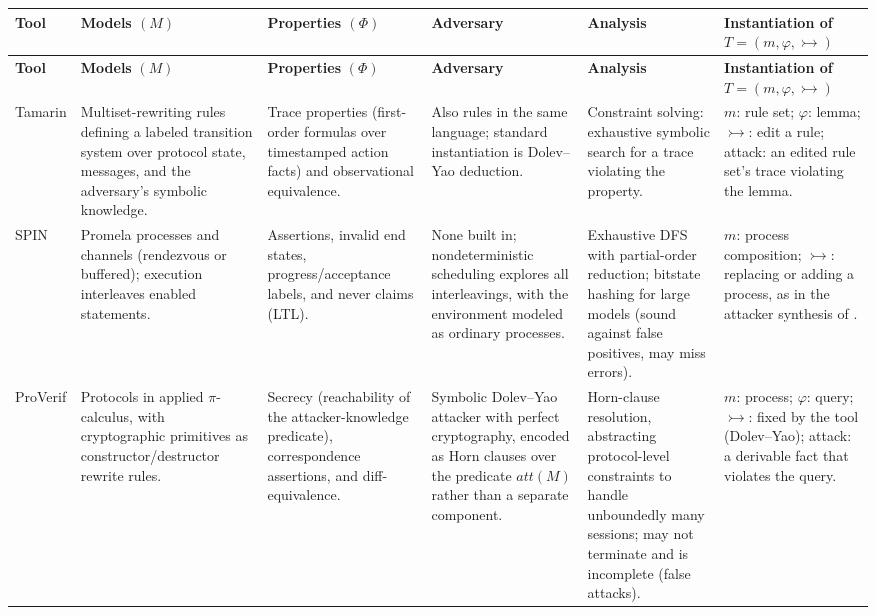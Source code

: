 \documentclass[11pt]{amsart}
\theoremstyle{definition}
\theoremstyle{remark}
\newcommand{\adv}{\rightarrowtail}   %
\begin{document}
\begin{landscape}
\begingroup
\footnotesize
\setlength{\tabcolsep}{3pt}
\renewcommand{\arraystretch}{1.25}
\begin{longtable}{L{1.7cm} L{4.0cm} L{3.5cm} L{4.2cm} L{4.4cm} L{3.6cm}}
\toprule
\textbf{Tool} & \textbf{Models} $(M)$ & \textbf{Properties} $(\Phi)$ & \textbf{Adversary} & \textbf{Analysis} & \textbf{Instantiation of $T = (m, \varphi, \adv)$} \\
\midrule
\endfirsthead
\toprule
\textbf{Tool} & \textbf{Models} $(M)$ & \textbf{Properties} $(\Phi)$ & \textbf{Adversary} & \textbf{Analysis} & \textbf{Instantiation of $T = (m, \varphi, \adv)$} \\
\midrule
\endhead
Tamarin \cite{tamarin} &
Multiset-rewriting rules defining a labeled transition system over protocol state, messages, and
the adversary's symbolic knowledge. &
Trace properties (first-order formulas over timestamped action facts) and observational
equivalence. &
Also rules in the same language; standard instantiation is Dolev--Yao deduction. &
Constraint solving: exhaustive symbolic search for a trace violating the property. &
$m$: rule set; $\varphi$: lemma; $\adv$: edit a rule; attack: an edited rule set's trace violating the lemma. \\
\addlinespace
SPIN \cite{spin} &
Promela processes and channels (rendezvous or buffered); execution interleaves enabled statements. &
Assertions, invalid end states, progress/acceptance labels, and never claims (LTL). &
None built in; nondeterministic scheduling explores all interleavings, with the environment
modeled as ordinary processes. &
Exhaustive DFS with partial-order reduction; bitstate hashing for large models (sound against
false positives, may miss errors). &
$m$: process composition; $\adv$: replacing or adding a process, as in the attacker synthesis of \cite{vonhippel}. \\
\addlinespace
ProVerif \cite{proverif} &
Protocols in applied $\pi$-calculus, with cryptographic primitives as constructor/destructor
rewrite rules. &
Secrecy (reachability of the attacker-knowledge predicate), correspondence assertions, and
diff-equivalence. &
Symbolic Dolev--Yao attacker with perfect cryptography, encoded as Horn clauses over the predicate
$\mathit{att}(M)$ rather than a separate component. &
Horn-clause resolution, abstracting protocol-level constraints to handle unboundedly many
sessions; may not terminate and is incomplete (false attacks). &
$m$: process; $\varphi$: query; $\adv$: fixed by the tool (Dolev--Yao); attack: a derivable fact that violates the query. \\

\end{longtable}
\end{landscape}
\end{document}
